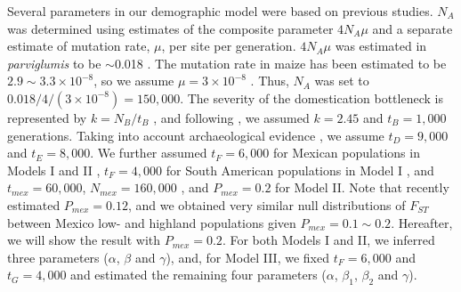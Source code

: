 Several parameters in our demographic model were based on previous studies.  
$N_A$ was determined using estimates of the composite parameter $4N_A\mu$ and a separate estimate of mutation rate, $\mu$, per site per generation.  $4N_A\mu$ was estimated in \emph{parviglumis} to be $\sim$0.018  \cite[]{Eyre-Walker_1998_9539756,Tenaillon_2001_11470895,Tenaillon_2004_15014173,Wright_2005_15919994,Ross-Ibarra_2009_19153259}.  
The mutation rate in maize has been estimated to be $2.9\sim 3.3\times 10^{-8}$, so we assume $\mu=3\times 10^{-8}$ \cite[]{Clark_2005_16079248}.  
Thus, $N_A$ was set to $0.018/4/(3\times 10^{-8}) = 150,000$.
The severity of the domestication bottleneck is represented by $k=N_B/t_B$ \cite[]{Eyre-Walker_1998_9539756,Wright_2005_15919994}, and following \cite{Wright_2005_15919994}, we assumed $k=2.45$ and $t_B=1,000$ generations.  
Taking into account archaeological evidence \cite[]{Piperno_2009_19307570}, we assume $t_D=9,000$ and $t_E=8,000$.  
We further assumed $t_F=6,000$ for Mexican populations in Models I and II \cite[]{Piperno_2006_69}, $t_F=4,000$ for South American populations in Model I \cite[]{Perry_2006_16511492}, and $t_{mex}=60,000$, $N_{mex}=160,000$ \cite[]{Ross-Ibarra_2009_19153259}, and $P_{mex}=0.2$ \cite[]{vanHeerwaarden_2011_21189301} for Model II. 
Note that \cite{Profford_2013} recently estimated $P_{mex}=0.12$,  and we obtained very similar null distributions of $F_{ST}$ between Mexico low- and highland populations given $P_{mex}=0.1\sim0.2$.
Hereafter, we will show the result with  $P_{mex}=0.2$.
For both Models I and II, we inferred three parameters ($\alpha$, $\beta$ and $\gamma$), and, for Model III, we fixed $t_F=6,000$ and $t_G=4,000$ \cite[]{Piperno_2006_69,Perry_2006_16511492} and estimated the remaining four parameters ($\alpha$, $\beta_1$, $\beta_2$ and $\gamma$).

 
